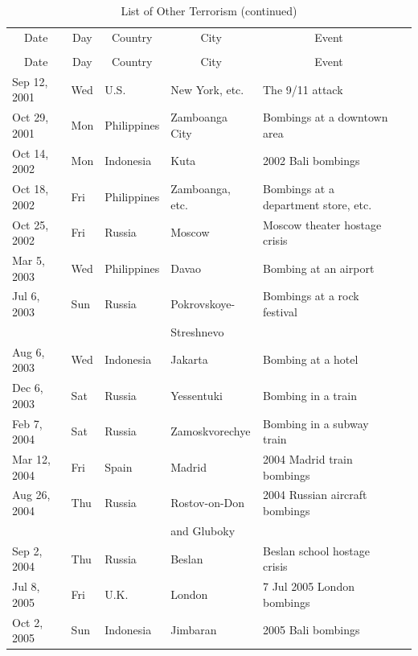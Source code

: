\documentclass[12pt,letterpaper]{scrartcl}
\begin{document}
\small
\singlespacing
\begin{longtable}[c]{lllllr}
\caption{\normalsize{List of Other Terrorism}}
\label{list_other_terrorism}
\bigskip \\\toprule
\multicolumn{1}{c}{Date} & \multicolumn{1}{c}{Day}& \multicolumn{1}{c}{Country} & \multicolumn{1}{c}{City} & \multicolumn{1}{c}{Event} \\\midrule
\endfirsthead
\caption{\normalsize{List of Other Terrorism (continued)}}
\bigskip \\\toprule
\multicolumn{1}{c}{Date} & \multicolumn{1}{c}{Day}& \multicolumn{1}{c}{Country} & \multicolumn{1}{c}{City} & \multicolumn{1}{c}{Event} \\\midrule
\endhead
\bottomrule
\endfoot
Sep 12, 2001 & Wed & U.S. & New York, etc. & The 9/11 attack \\
Oct 29, 2001 & Mon & Philippines & Zamboanga City & Bombings at a downtown area \\
Oct 14, 2002 & Mon & Indonesia & Kuta & 2002 Bali bombings \\
Oct 18, 2002 & Fri & Philippines & Zamboanga, etc. & Bombings at a department store, etc. \\
Oct 25, 2002 & Fri & Russia & Moscow & Moscow theater hostage crisis \\
Mar 5, 2003 & Wed & Philippines & Davao & Bombing at an airport \\
Jul 6, 2003 & Sun & Russia & Pokrovskoye- & Bombings at a rock festival \\
 & & & \hspace{0.5em}Streshnevo & \\
Aug 6, 2003 & Wed & Indonesia & Jakarta & Bombing at a hotel \\
Dec 6, 2003 & Sat & Russia & Yessentuki & Bombing in a train \\
Feb 7, 2004 & Sat & Russia & Zamoskvorechye & Bombing in a subway train \\
Mar 12, 2004 & Fri & Spain & Madrid & 2004 Madrid train bombings \\
Aug 26, 2004 & Thu & Russia & Rostov-on-Don & 2004 Russian aircraft bombings \\
 & & & \hspace{0.5em}and Gluboky & \\
Sep 2, 2004 & Thu & Russia & Beslan & Beslan school hostage crisis \\
Jul 8, 2005 & Fri & U.K. & London & 7 Jul 2005 London bombings \\
Oct 2, 2005 & Sun & Indonesia & Jimbaran & 2005 Bali bombings \\

\end{longtable}
\end{document}
